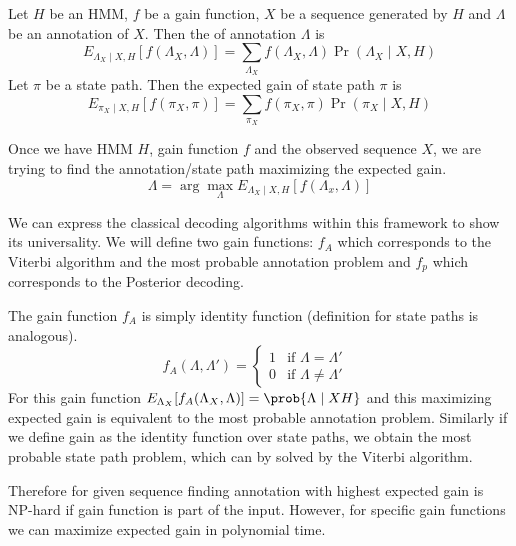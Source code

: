 \begin{definition}
Let $H$ be an HMM, $f$ be a gain function, $X$ be a sequence generated by $H$ and
$\Lambda$ be an annotation of $X$. Then the  of annotation
$\Lambda$ is 
\begin{equation}
E_{\Lambda_X\mid X,H}[f(\Lambda_X,\Lambda)] =
\sum_{\Lambda_X}f(\Lambda_X,\Lambda)\Pr\left(\Lambda_X\mid X,H\right)
\end{equation}
Let $\pi$ be a state path. Then the expected gain of state path $\pi$ is 
\begin{equation}
E_{\pi_X\mid X,H}[f(\pi_X,\pi)] =
\sum_{\pi_X}f(\pi_X,\pi)\Pr\left(\pi_X\mid X,H\right)
\end{equation}

\end{definition}


Once we have HMM $H$, gain function $f$ and the observed sequence $X$,
we are trying to find the annotation/state path maximizing the expected gain. 
\begin{equation}
\Lambda = \arg\max_{\Lambda}E_{\Lambda_X\mid
X,H}\left[f\left(\Lambda_x,\Lambda\right)\right]
\end{equation}

We can express the classical decoding algorithms within this framework to show
its universality. We will define two gain functions: $f_A$ which corresponds to
the  
Viterbi algorithm and the most probable annotation problem and $f_p$ which
corresponds to 
the Posterior decoding.

The gain function $f_A$ is simply identity function (definition for state paths
is analogous).
\begin{equation}
f_A(\Lambda,\Lambda') = \begin{cases}
1 & \text{if $\Lambda = \Lambda'$ }\\
0 & \text{if $\Lambda \not=\Lambda'$}
\end{cases}
\end{equation}
For this gain function $E_{\Lambda_X}[f_A(\Lambda_X,\Lambda)]=\prob{\Lambda\mid
X H}$ and this
maximizing expected gain is 
equivalent to the most probable annotation problem. Similarly if we define gain
as the identity function over state paths, we obtain the most probable state
path problem, which can by solved by the Viterbi algorithm.

Therefore for given sequence finding annotation with highest expected gain is
NP-hard if gain function is part of the input. However, for specific gain
functions we can maximize expected gain in polynomial time.

